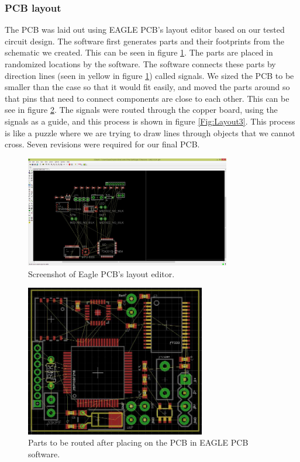 \subsubsection{PCB layout}
The PCB was laid out using EAGLE PCB's layout editor based on our tested circuit design.
The software first generates parts and their footprints from the schematic we created.
This can be seen in figure \ref{Fig:Layout1}.
The parts are placed in randomized locations by the software.
The software connects these parts by direction lines (seen in yellow in figure \ref{Fig:Layout1}) called signals.
We sized the PCB to be smaller than the case so that it would fit easily, and moved the parts around so that pins that need to connect components are close to each other.
This can be see in figure \ref{Fig:Layout2}.
The signals were routed through the copper board,
using the signals as a guide, and this process is shown in figure \ref{Fig:Layout3}.
This process is like a puzzle where we are trying to draw lines through objects that we cannot cross.
Seven revisions were required for our final PCB.
\begin{figure}
\begin{center}
\includegraphics[width=0.8\textwidth]{images/Layout1.jpg}
\caption{Screenshot of Eagle PCB's layout editor.}
\label{Fig:Layout1}
\end{center}
\end{figure}
\begin{figure}
\begin{center}
\includegraphics[width=0.7\textwidth]{images/Layout2.jpg}
\caption{Parts to be routed after placing on the PCB in EAGLE PCB software.}
\label{Fig:Layout2}
\end{center}
\end{figure}

